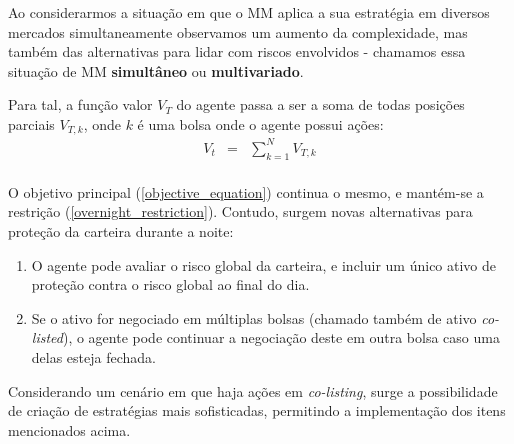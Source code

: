Ao considerarmos a situação em que o MM aplica a sua estratégia em diversos mercados simultaneamente observamos um aumento da complexidade, mas também das alternativas para lidar com riscos envolvidos - chamamos essa situação de MM \textbf{simultâneo} ou \textbf{multivariado}.

Para tal, a função valor $V_{T}$ do agente passa a ser a soma de todas posições parciais $V_{T, k}$, onde $k$ é uma bolsa onde o agente possui ações:
\begin{eqnarray*}
    V_t &=& \sum_{k=1}^N V_{T, k}\\
\end{eqnarray*}

O objetivo principal (\ref{objective_equation}) continua o mesmo, e mantém-se a restrição (\ref{overnight_restriction}). Contudo, surgem novas alternativas para proteção da carteira durante a noite:

\begin{enumerate}
    \item O agente pode avaliar o risco global da carteira, e incluir um único ativo de proteção contra o risco global ao final do dia.
    \item Se o ativo for negociado em múltiplas bolsas (chamado também de ativo \textit{co-listed}), o agente pode continuar a negociação deste em outra bolsa caso uma delas esteja fechada.
\end{enumerate}

Considerando um cenário em que haja ações em \textit{co-listing}, surge a possibilidade de criação de estratégias mais sofisticadas, permitindo a implementação dos itens mencionados acima.
